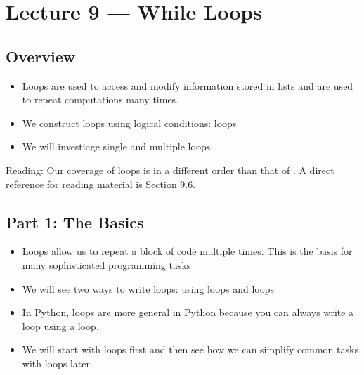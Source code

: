 \documentclass[letterpaper,10pt,english]{sphinxmanual}
\begin{document}
\chapter{Lecture 9 — While Loops}
\label{\detokenize{lecture_notes/lec09_loops1_while:lecture-9-while-loops}}\label{\detokenize{lecture_notes/lec09_loops1_while::doc}}

\section{Overview}
\label{\detokenize{lecture_notes/lec09_loops1_while:overview}}\begin{itemize}
\item {} 
Loops are used to access and modify information stored in lists and
are used to repeat computations many times.

\item {} 
We construct loops using logical conditions:  loops

\item {} 
We will investiage single and multiple loops

\end{itemize}

Reading:  Our coverage of loops is in a different order than that of
.  A direct reference for reading material is
Section 9.6.


\section{Part 1: The Basics}
\label{\detokenize{lecture_notes/lec09_loops1_while:part-1-the-basics}}\begin{itemize}
\item {} 
Loops allow us to repeat a block of code multiple times. This is
the basis for many sophisticated programming tasks

\item {} 
We will see two ways to write loops: using  loops and  loops

\item {} 
In Python,  loops are more general in Python because you
can always write a  loop using a  loop.

\item {} 
We will start with  loops first and then see how we can
simplify common tasks with  loops later.

\end{itemize}
\end{document}
